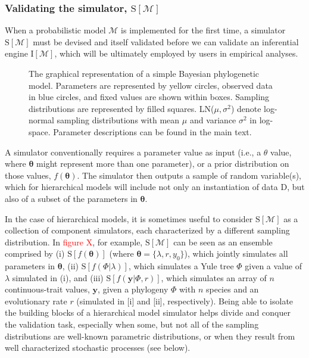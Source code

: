 \documentclass[oneside]{article}
\begin{document}
\subsubsection*{Validating the simulator, $\text{S}[\mathcal{M}]$}
\label{verify-correctness-of-simulator-implementation}

When a probabilistic model $\mathcal{M}$ is implemented for the first
time, a simulator $\text{S}[\mathcal{M}]$ must be devised and itself
validated before we can validate an inferential engine $\text{I}[\mathcal{M}]$, which will be ultimately employed by users in empirical
analyses.
\begin{figure}
      
  \caption{The graphical representation of a simple Bayesian
    phylogenetic model.
    Parameters are represented by yellow circles, observed data
    in blue circles, and fixed values are shown within boxes.
    Sampling distributions are represented by filled squares.
    LN($\mu,\sigma^2$) denote log-normal sampling distributions
    with mean $\mu$ and variance $\sigma^2$ in log-space.
    Parameter descriptions can be found in the main text.
    }
  \label{fig:pgm}
\end{figure}
A simulator conventionally requires a parameter value as input (i.e.,
a $\theta$ value, where $\boldsymbol{\theta}$ might represent more than one
parameter), or a prior distribution on those values,
$f(\boldsymbol{\theta})$. 
The simulator then outputs a sample of random variable(s), which
for hierarchical models will include not only an instantiation of data
$\text{D}$, but also of a subset of the parameters in
$\boldsymbol{\theta}$.
 
In the case of hierarchical models, it is sometimes useful
to consider $\text{S}[\mathcal{M}]$ as a collection of component
simulators, each characterized by a different sampling distribution.
In \textcolor{red}{figure X}, for example, $\text{S}[\mathcal{M}]$ can be seen as an ensemble
comprised by (i) $\text{S}[f(\boldsymbol{\theta})]$ (where $\boldsymbol{\theta} = \{\lambda, r, y_0\}$),
which jointly simulates all parameters in $\boldsymbol{\theta}$,
(ii) $\text{S}[f(\Phi|\lambda)]$, which simulates a Yule tree $\Phi$ given a
value of $\lambda$ simulated in (i), and (iii)
$\text{S}[f(\boldsymbol{y}|\Phi,r)]$, which simulates an array of $n$ continuous-trait
values, $\boldsymbol{y}$, given a phylogeny $\Phi$ with $n$ species and
an evolutionary rate $r$ (simulated in [i] and [ii], respectively).
Being able to isolate the building blocks of a hierarchical model simulator 
helps divide and conquer the validation task, especially when some, but
not all of the sampling distributions are well-known parametric distributions,
or when they result from well characterized stochastic processes (see below).
\end{document}
